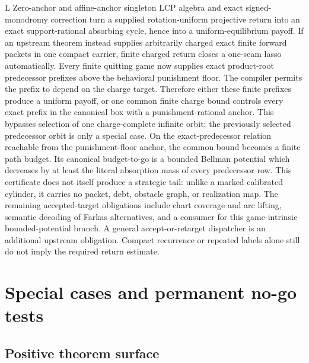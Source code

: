 \documentclass[11pt]{article}
\newcommand{\LTag}{\textsf{L}}
\newcommand{\Prod}{\LTag}
\newcommand{\Status}[1]{#1}
\begin{document}
\Status{\Prod} Zero-anchor and affine-anchor singleton LCP algebra and exact
signed-monodromy correction turn a supplied rotation-uniform projective return
into an exact support-rational absorbing cycle, hence into a uniform-equilibrium
payoff.  If an upstream theorem instead supplies arbitrarily charged exact
finite forward packets in one compact carrier, finite charged return closes a
one-seam lasso automatically.  Every finite quitting game now supplies exact
product-root predecessor prefixes above the behavioral punishment floor.  The
compiler permits the prefix to depend on the charge target.  Therefore either
these finite prefixes produce a uniform payoff, or one common finite charge
bound controls every exact prefix in the canonical box with a
punishment-rational anchor.  This bypasses selection of one charge-complete
infinite orbit; the previously selected predecessor orbit is only a special
case.  On the exact-predecessor relation reachable from the punishment-floor
anchor, the common bound becomes a finite path budget.  Its canonical
budget-to-go is a bounded Bellman potential which decreases by at least the
literal absorption mass of every predecessor row.  This certificate does not
itself produce a strategic tail: unlike a marked calibrated cylinder, it carries
no packet, debt, obstacle graph, or realization map.  The remaining
accepted-target obligations include chart coverage and arc lifting, semantic
decoding of Farkas alternatives, and a consumer for this game-intrinsic
bounded-potential branch.  A general accept-or-retarget dispatcher is an
additional upstream obligation.  Compact recurrence or repeated labels alone
still do not imply the required return estimate.

\section{Special cases and permanent no-go tests}

\subsection{Positive theorem surface}
\end{document}
